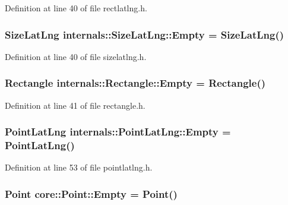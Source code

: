 \-Definition at line 40 of file rectlatlng.\-h.

\hypertarget{group___o_p_map_widget_gad305f7cf650e7a5490bb77ccc65bbe08}{
\subsubsection[{\-Empty}]{\setlength{\rightskip}{0pt plus 5cm}\-Size\-Lat\-Lng {\bf internals\-::\-Size\-Lat\-Lng\-::\-Empty} = \-Size\-Lat\-Lng()}}\label{group___o_p_map_widget_gad305f7cf650e7a5490bb77ccc65bbe08}


\-Definition at line 40 of file sizelatlng.\-h.

\hypertarget{group___o_p_map_widget_ga747b738c524d1f0bb7b4a00e9de42da4}{
\subsubsection[{\-Empty}]{\setlength{\rightskip}{0pt plus 5cm}\-Rectangle {\bf internals\-::\-Rectangle\-::\-Empty} = \-Rectangle()}}\label{group___o_p_map_widget_ga747b738c524d1f0bb7b4a00e9de42da4}


\-Definition at line 41 of file rectangle.\-h.

\hypertarget{group___o_p_map_widget_gac62d167bf1e7f0374f7e536e64320c13}{
\subsubsection[{\-Empty}]{\setlength{\rightskip}{0pt plus 5cm}\-Point\-Lat\-Lng {\bf internals\-::\-Point\-Lat\-Lng\-::\-Empty} = \-Point\-Lat\-Lng()}}\label{group___o_p_map_widget_gac62d167bf1e7f0374f7e536e64320c13}


\-Definition at line 53 of file pointlatlng.\-h.

\hypertarget{group___o_p_map_widget_ga8f0f8df337a57e048e21c0410bd1a7e3}{
\subsubsection[{\-Empty}]{\setlength{\rightskip}{0pt plus 5cm}\-Point {\bf core\-::\-Point\-::\-Empty} = \-Point()}}\label{group___o_p_map_widget_ga8f0f8df337a57e048e21c0410bd1a7e3}


